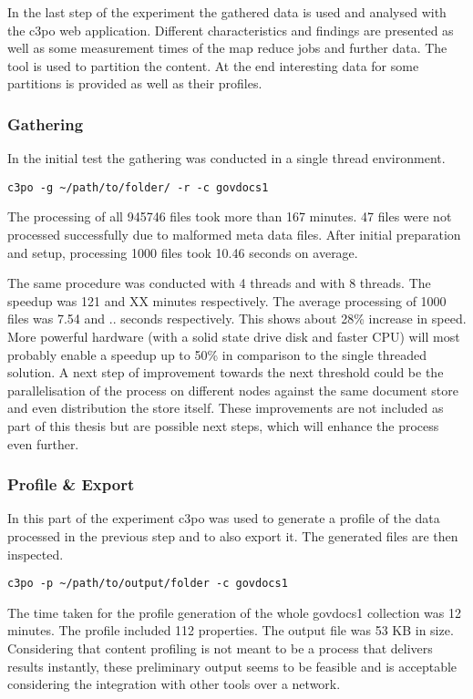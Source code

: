 In the last step of the experiment the gathered data is used and analysed with the c3po web application. Different characteristics and findings are presented as well as some measurement times of the map reduce jobs and further data. The tool is used to partition the content. At the end interesting data for some partitions is provided as well as their profiles.

\subsubsection{Gathering}
In the initial test the gathering was conducted in a single thread environment. 

\begin{verbatim}
c3po -g ~/path/to/folder/ -r -c govdocs1
\end{verbatim}

The processing of all 945746 files took more than 167 minutes. 47 files were not processed successfully due to malformed meta data files. After initial preparation and setup, processing 1000 files took 10.46 seconds on average.

The same procedure was conducted with 4 threads and with 8 threads. The speedup was 121 and XX minutes respectively. The average processing of 1000 files was 7.54 and ..  seconds respectively. This shows about 28\% increase in speed. More powerful hardware (with a solid state drive disk and faster CPU) will most probably enable a speedup up to 50\% in comparison to the single threaded solution. A next step of improvement towards the next threshold could be the parallelisation of the process on different nodes against the same document store and even distribution the store itself. These improvements are not included as part of this thesis but are possible next steps, which will enhance the process even further.

\subsubsection{Profile \& Export}
In this part of the experiment c3po was used to generate a profile of the data processed in the previous step and to also export it. The generated files are then inspected.

\begin{verbatim}
c3po -p ~/path/to/output/folder -c govdocs1
\end{verbatim}

The time taken for the profile generation of the whole govdocs1 collection was 12 minutes. The profile included 112 properties. The output file was 53 KB in size. Considering that content profiling is not meant to be a process that delivers results instantly, these preliminary output seems to be feasible and is acceptable considering the integration with other tools over a network.

